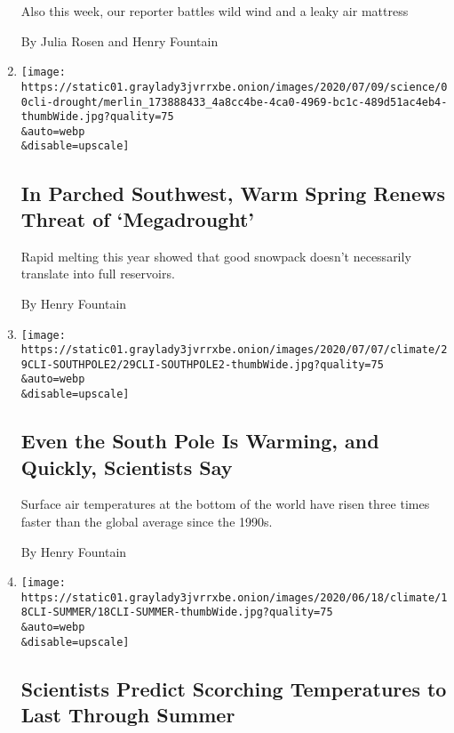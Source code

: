 \begin{enumerate}
  Also this week, our reporter battles wild wind and a leaky air
  mattress

  By Julia Rosen and Henry Fountain
\item
  \href{/2020/07/08/climate/southwest-megadrought-climate-change.html}{}

  \texttt{[image: https://static01.graylady3jvrrxbe.onion/images/2020/07/09/science/00cli-drought/merlin\_173888433\_4a8cc4be-4ca0-4969-bc1c-489d51ac4eb4-thumbWide.jpg?quality=75\\\&auto=webp\\\&disable=upscale]}

  \hypertarget{in-parched-southwest-warm-spring-renews-threat-of-megadrought}{%
  \subsection{In Parched Southwest, Warm Spring Renews Threat of
  `Megadrought'}\label{in-parched-southwest-warm-spring-renews-threat-of-megadrought}}

  Rapid melting this year showed that good snowpack doesn't necessarily
  translate into full reservoirs.

  By Henry Fountain
\item
  \href{/2020/06/29/climate/south-pole-warming-climate-change.html}{}

  \texttt{[image: https://static01.graylady3jvrrxbe.onion/images/2020/07/07/climate/29CLI-SOUTHPOLE2/29CLI-SOUTHPOLE2-thumbWide.jpg?quality=75\\\&auto=webp\\\&disable=upscale]}

  \hypertarget{even-the-south-pole-is-warming-and-quickly-scientists-say}{%
  \subsection{Even the South Pole Is Warming, and Quickly, Scientists
  Say}\label{even-the-south-pole-is-warming-and-quickly-scientists-say}}

  Surface air temperatures at the bottom of the world have risen three
  times faster than the global average since the 1990s.

  By Henry Fountain
\item
  \href{/2020/06/18/climate/summer-weather-prediction.html}{}

  \texttt{[image: https://static01.graylady3jvrrxbe.onion/images/2020/06/18/climate/18CLI-SUMMER/18CLI-SUMMER-thumbWide.jpg?quality=75\\\&auto=webp\\\&disable=upscale]}

  \hypertarget{scientists-predict-scorching-temperatures-to-last-through-summer}{%
  \subsection{Scientists Predict Scorching Temperatures to Last Through
  Summer}\label{scientists-predict-scorching-temperatures-to-last-through-summer}}


\end{enumerate}
